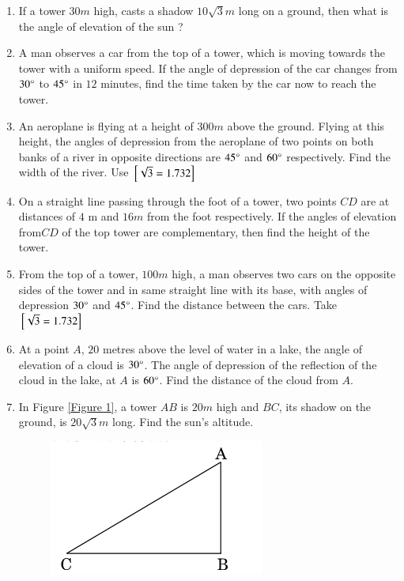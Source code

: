 \begin{enumerate}[label=\thesubsection.\arabic*.,ref=\thesubsection.\theenumi]
%
\hfill{}
\item If a tower $30m$ high, casts a shadow $10\sqrt{3}m$ long on a ground, then what is the angle of elevation of the sun ?
\hfill{}\item A man observes a car from the top of a tower, which is  moving towards the tower with a uniform speed. If the angle of depression of the car changes from $30\degree$ to $45\degree$ in $12$ minutes, find the time taken by the car now to reach the tower.
\hfill{}\item An aeroplane is flying at a height of $300 m$ above the ground. Flying at this height, the angles of depression from the aeroplane of two points on both banks of a river in opposite directions are $45\degree$ and $60\degree$ respectively. Find the width of the river. 
\hfill Use ${}\left[\sqrt 3 = 1.732\right]$
\hfill{}\item On a straight line passing through the foot of a tower, two points $C$$D$ are at distances of $4$ m
and $16m$ from the foot respectively. If the angles of elevation from$C$$D$ of the top tower are complementary, then find the height of the tower.  
\hfill{}\item From the top of a tower, $100m$ high, a man observes two cars on the opposite sides of the tower and in same straight line with its base, with angles of depression $30\degree$ and $45\degree$. Find the distance between the cars.
Take ${}\left[\sqrt{3} = 1.732\right]$
\hfill{}
\item At a point $A$, $20$ metres above the level of water in a lake, the angle of elevation of a cloud is $30 \degree$. The angle of depression of the reflection of the cloud in the lake, at $A$ is $60\degree $. Find the distance of the cloud from $A$.
\hfill{}\item In Figure \ref{Figure 1},  a tower $AB$ is $20m$ high and $BC$,  its shadow on the ground, is $20\sqrt{3}m$ long. Find the sun's altitude.
\begin{figure}[H]
	\centering
    \includegraphics[width=\columnwidth]{cbse/figs/cbse_30_3_1.png}

\end{figure}
\end{enumerate}
